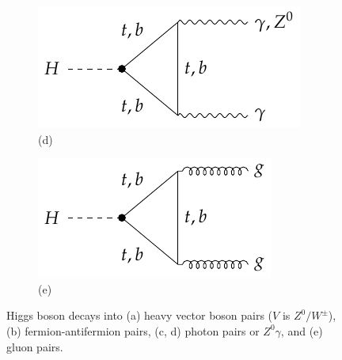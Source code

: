 \begin{figure}[!ht]
    \begin{subfigure}[t]{0.33\mylength}
            \centering
            \includegraphics[height=0.1539\mylength]{resources/H_decay_diagrams/v4.pdf}
            \setlength{\unitlength}{0.25\mylength}
            \caption{\footnotesize (d)}
    \end{subfigure}%
    \begin{subfigure}[t]{0.33\mylength}
            \centering
            \includegraphics[height=0.1539\mylength]{resources/H_decay_diagrams/v5.pdf}
            \setlength{\unitlength}{0.25\mylength}
            \caption{\footnotesize (e)}
    \end{subfigure}%
    \vspace*{-0.0cm}
    \caption{Higgs boson decays into (a) heavy vector boson pairs ($V$ is $Z^{0}/W^{\pm}$), (b) fermion-antifermion pairs, (c, d) photon pairs or $Z^0\gamma$, and (e) gluon pairs.}
    \label{fig:Higgs_decays}
    \vspace*{-0.0cm}
\end{figure}


